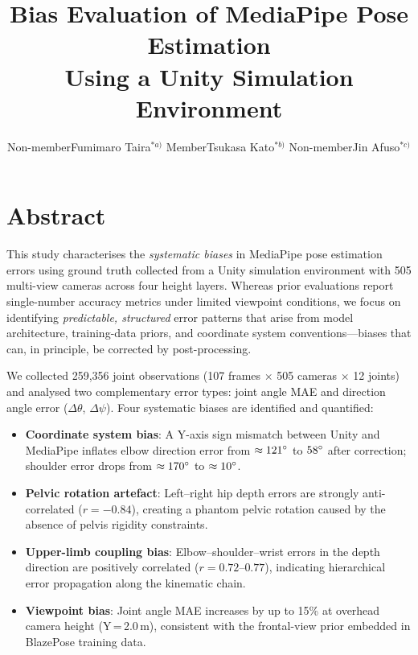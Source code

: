 \documentclass[twocolumn]{article}
\title{Bias Evaluation of MediaPipe Pose Estimation\\
       Using a Unity Simulation Environment}
\author{%
  Non-member\quad Fumimaro Taira$^{*a)}$ \qquad
  Member\quad    Tsukasa Kato$^{*b)}$ \qquad
  Non-member\quad Jin Afuso$^{*c)}$\footnotemark[1]
}
\date{}
\begin{document}
\maketitle

\begingroup
\renewcommand{\thefootnote}{}
\endgroup

\section*{Abstract}

This study characterises the \emph{systematic biases} in MediaPipe pose
estimation errors using ground truth collected from a Unity simulation
environment with 505 multi-view cameras across four height layers.
Whereas prior evaluations report single-number accuracy metrics under
limited viewpoint conditions, we focus on identifying \emph{predictable,
structured} error patterns that arise from model architecture, training-data
priors, and coordinate system conventions---biases that can, in principle,
be corrected by post-processing.

We collected 259,356 joint observations (107 frames $\times$ 505 cameras
$\times$ 12 joints) and analysed two complementary error types: joint angle
MAE and direction angle error ($\Delta\theta$, $\Delta\psi$). Four
systematic biases are identified and quantified:
\begin{itemize}\itemsep0pt
  \item \textbf{Coordinate system bias}: A Y-axis sign mismatch between Unity
        and MediaPipe inflates elbow direction error from $\approx121\degree{}$ to
        $58\degree{}$ after correction; shoulder error drops from $\approx170\degree{}$ to
        $\approx10\degree{}$.
  \item \textbf{Pelvic rotation artefact}: Left--right hip depth errors are
        strongly anti-correlated ($r=-0.84$), creating a phantom pelvic
        rotation caused by the absence of pelvis rigidity constraints.
  \item \textbf{Upper-limb coupling bias}: Elbow--shoulder--wrist errors in
        the depth direction are positively correlated ($r=0.72$--$0.77$),
        indicating hierarchical error propagation along the kinematic chain.
  \item \textbf{Viewpoint bias}: Joint angle MAE increases by up to 15\% at
        overhead camera height (Y\,=\,2.0\,m), consistent with the frontal-view
        prior embedded in BlazePose training data.
\end{itemize}
\end{document}
